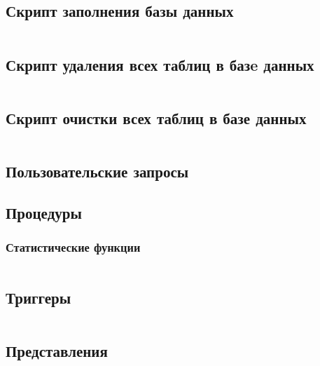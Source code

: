 \documentclass[12 pt, a4paper]{article}
\begin{document}
\subsection{Скрипт заполнения базы данных}
\inputminted{sql}{../scripts/fill_db.sql}
\subsection{Скрипт удаления всех таблиц в базe данных}
\inputminted{sql}{../scripts/drop_db.sql}
\subsection{Скрипт очистки всех таблиц в базе данных}
\inputminted{sql}{../scripts/clear_db.sql}
\subsection{Пользовательские запросы}
\subsection{Процедуры}
\subsubsection{Статистические функции}
\inputminted{sql}{../scripts/statistic_functions.sql}
\subsection{Триггеры}
\inputminted{sql}{../scripts/triggers.sql}
\subsection{Представления}
\end{document}
